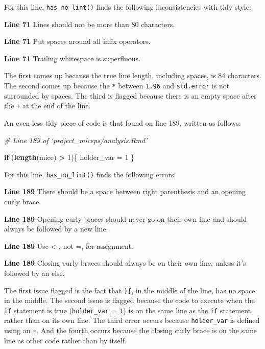\documentclass[12pt,twoside]{reedthesis}
\newenvironment{Shaded}{\begin{snugshade}}{\end{snugshade}}
\newcommand{\KeywordTok}[1]{\textcolor[rgb]{0.13,0.29,0.53}{\textbf{#1}}}
\newcommand{\DecValTok}[1]{\textcolor[rgb]{0.00,0.00,0.81}{#1}}
\newcommand{\StringTok}[1]{\textcolor[rgb]{0.31,0.60,0.02}{#1}}
\newcommand{\CommentTok}[1]{\textcolor[rgb]{0.56,0.35,0.01}{\textit{#1}}}
\newcommand{\ControlFlowTok}[1]{\textcolor[rgb]{0.13,0.29,0.53}{\textbf{#1}}}
\newcommand{\OperatorTok}[1]{\textcolor[rgb]{0.81,0.36,0.00}{\textbf{#1}}}
\newcommand{\NormalTok}[1]{#1}
\begin{document}
For this line, \texttt{has\_no\_lint()} finds the following
inconsistencies with tidy style:

\textbf{Line 71} Lines should not be more than 80 characters.

\textbf{Line 71} Put spaces around all infix operators.

\textbf{Line 71} Trailing whitespace is superfluous.

The first comes up because the true line length, including spaces, is 84
characters. The second comes up because the \texttt{*} between
\texttt{1.96} and \texttt{std.error} is not surrounded by spaces. The
third is flagged because there is an empty space after the \texttt{+} at
the end of the line.

An even less tidy piece of code is that found on line 189, written as
follows:

\footnotesize
\begin{Shaded}
\begin{Highlighting}[]
\CommentTok{# Line 189 of `project_miceps/analysis.Rmd'}

\ControlFlowTok{if}\NormalTok{ (}\KeywordTok{length}\NormalTok{(mice) }\OperatorTok{>}\StringTok{ }\DecValTok{1}\NormalTok{)\{ holder_var =}\StringTok{ }\DecValTok{1}\NormalTok{ \}}
\end{Highlighting}
\end{Shaded}
\normalsize

For this line, \texttt{has\_no\_lint()} finds the following errors:

\textbf{Line 189} There should be a space between right parenthesis and
an opening curly brace.

\textbf{Line 189} Opening curly braces should never go on their own line
and should always be followed by a new line.

\textbf{Line 189} Use \textless{}-, not =, for assignment.

\textbf{Line 189} Closing curly braces should always be on their own
line, unless it's followed by an else.

The first issue flagged is the fact that \texttt{)\{}, in the middle of
the line, has no space in the middle. The second issue is flagged
because the code to execute when the \texttt{if} statement is true
(\texttt{holder\_var\ =\ 1}) is on the same line as the \texttt{if}
statement, rather than on its own line. The third error occurs because
\texttt{holder\_var} is defined using an \texttt{=}. And the fourth
occurs because the closing curly brace is on the same line as other code
rather than by itself.
\end{document}
